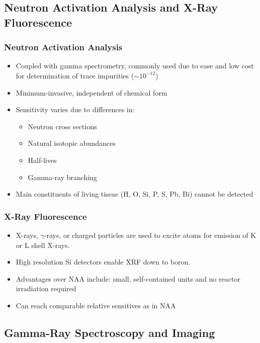 \subsection{Neutron Activation Analysis and X-Ray Fluorescence}
\subsubsection{Neutron Activation Analysis}
\begin{itemize}
    \item Coupled with gamma spectrometry, commonly used due to ease and low cost for determination of trace impurities ($\sim10^{-12}$) 
    \item Minimum-invasive, independent of chemical form
    \item Sensitivity varies due to differences in: 
    \begin{itemize}
        \item Neutron cross sections
        \item Natural isotopic abundances
        \item Half-lives
        \item Gamma-ray branching
    \end{itemize}
    \item Main constituents of living tissue (H, O, Si, P, S, Pb, Bi) cannot be detected
\end{itemize}
\subsubsection{X-Ray Fluorescence}
\begin{itemize}
    \item X-rays, $\gamma$-rays, or charged particles are used to excite atoms for emission of K or L shell X-rays.
    \item High resolution Si detectors enable XRF down to boron.
    \item Advantages over NAA include: small, self-contained units and no reactor irradiation required
    \item Can reach comparable relative sensitives as in NAA
\end{itemize}
\subsection{Gamma-Ray Spectroscopy and Imaging}
